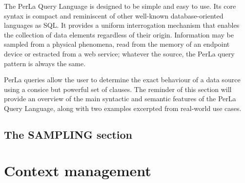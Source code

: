 The PerLa Query Language is designed to be simple and easy to use. Its core
syntax is compact and reminiscent of other well-known database-oriented
languages as SQL. It provides a uniform interrogation mechanism that enables
the collection of data elements regardless of their origin. Information may be
sampled from a physical phenomena, read from the memory of an endpoint device
or estracted from a web service; whatever the source, the PerLa query pattern
is always the same.

PerLa queries allow the user to determine the exact behaviour of a data source
using a consice but powerful set of clauses. The reminder of this section will
provide an overview of the main syntactic and semantic features of the PerLa
Query Language, along with two examples excerpted from real-world use cases.

\subsection{The \textbf{SAMPLING} section}





\section{Context management}

